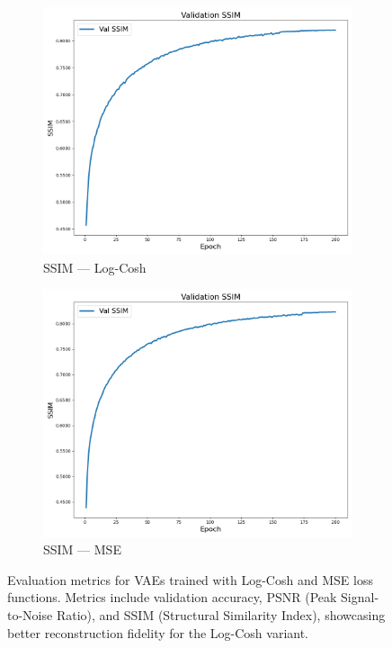 \begin{figure}[p]
    \begin{subfigure}[b]{0.48\textwidth}
        \includegraphics[width=\textwidth]{img/vae_results/200_epochs_128_ls_logcosh/logcosh_val_ssim.png}
        \caption{SSIM — Log-Cosh}
    \end{subfigure}
    \hfill
    \begin{subfigure}[b]{0.48\textwidth}
        \includegraphics[width=\textwidth]{img/vae_results/200_epochs_128_ls_mse/mse_val_ssim.png}
        \caption{SSIM — MSE}
    \end{subfigure}

    \caption[Performance metrics for Log-Cosh vs MSE VAEs]{%
Evaluation metrics for VAEs trained with Log-Cosh and MSE loss functions. Metrics include validation accuracy, PSNR (Peak Signal-to-Noise Ratio), and SSIM (Structural Similarity Index), showcasing better reconstruction fidelity for the Log-Cosh variant.}
    \label{fig:vae_loss_comparison_2}
\end{figure}

